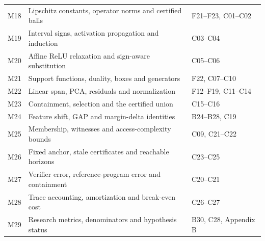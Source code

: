 \documentclass[11pt,a4paper]{article}
\begin{document}
\begin{longtable}{@{}P{1.2cm}P{7.3cm}P{6.7cm}@{}}
M18 & Lipschitz constants, operator norms and certified balls & F21--F23, C01--C02\\
M19 & Interval signs, activation propagation and induction & C03--C04\\
M20 & Affine ReLU relaxation and sign-aware substitution & C05--C06\\
M21 & Support functions, duality, boxes and generators & F22, C07--C10\\
M22 & Linear span, PCA, residuals and normalization & F12--F19, C11--C14\\
M23 & Containment, selection and the certified union & C15--C16\\
M24 & Feature shift, GAP and margin-delta identities & B24--B28, C19\\
M25 & Membership, witnesses and access-complexity bounds & C09, C21--C22\\
M26 & Fixed anchor, stale certificates and reachable horizons & C23--C25\\
M27 & Verifier error, reference-program error and containment & C20--C21\\
M28 & Trace accounting, amortization and break-even cost & C26--C27\\
M29 & Research metrics, denominators and hypothesis status & B30, C28, Appendix B\\\bottomrule
\end{longtable}
\normalsize

\clearpage
\end{document}
